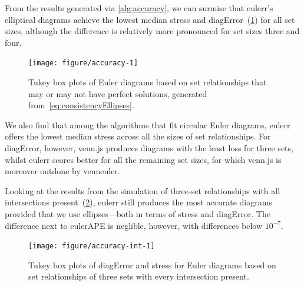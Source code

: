 \documentclass[
  oneside,
  openany,
  numbers=noendperiod,
  parskip=half,
  bibliography=totoc
]{scrbook}\usepackage[]{graphicx}\usepackage{xcolor}
\newenvironment{knitrout}{}{} %
\newcommand{\pkg}[1]{{\fontseries{b}\selectfont #1}}
\begin{document}
From the results generated via \cref{alg:accuracy}, we can
surmise that \pkg{eulerr}'s elliptical diagrams achieve the lowest median stress and
diagError~(\cref{fig:accuracy}) for all set sizes, although the difference is
relatively more pronounced for set sizes three and four.

\begin{figure}[hbtp]
\begin{knitrout}\small
{}\color{fgcolor}

{\centering \texttt{[image: figure/accuracy-1]} 

}



\end{knitrout}
\caption{Tukey box plots of Euler diagrams based on set relationships that may
or may not have perfect solutions, generated from~\eqref{eq:consistencyEllipses}.\label{fig:accuracy}}
\end{figure}

We also find that among the algorithms that fit circular Euler diagrams,
\pkg{eulerr} offers the lowest median stress across all the sizes of set
relationships. For diagError, however, \pkg{venn.js} produces diagrams with the
least loss for three sets, whilst \pkg{eulerr} scores better for all the remaining set sizes,
for which \pkg{venn.js} is moreover outdone by \pkg{venneuler}.



Looking at the results from the simulation of three-set relationships with
all intersections present~(\cref{fig:accuracy-int}), \pkg{eulerr} still
produces the most accurate diagrams provided that we use ellipses---both in
terms of stress and diagError. The
difference next to \pkg{eulerAPE} is neglible, however, with differences
below $10^{-7}$.

\begin{figure}[hbtp]
\caption{Tukey box plots of diagError and stress for Euler diagrams
based on set relationships of three sets with every
intersection present.\label{fig:accuracy-int}}
\begin{knitrout}\small
{}\color{fgcolor}

{\centering \texttt{[image: figure/accuracy-int-1]} 

}



\end{knitrout}
\end{figure}
\end{document}
